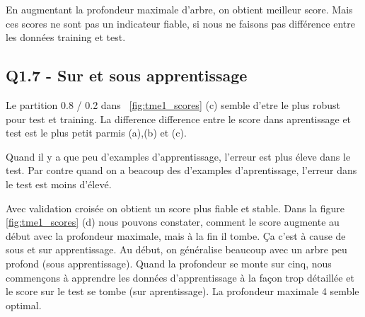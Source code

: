 \documentclass[a4paper,12pt]{article}
\begin{document}
En augmentant la profondeur maximale d'arbre, on obtient meilleur score.
Mais ces scores ne sont pas un indicateur fiable, si nous ne faisons pas différence entre les données training et test.

\subsection{Q1.7 -  Sur et sous apprentissage }

Le partition 0.8 / 0.2 dans ~\autoref{fig:tme1_scores} (c) semble d'etre le plus robust pour test et training.
La difference difference entre le score dans aprentissage et test est le plus petit parmis (a),(b) et (c).

Quand il y a que peu d'examples d'apprentissage, l'erreur est plus éleve dans le test.
Par contre quand on a beacoup des d'examples d'aprentissage, l'erreur dans le test est moins d'élevé.

Avec validation croisée on obtient un score plus fiable et stable.
Dans la figure \autoref{fig:tme1_scores} (d) nous pouvons constater, comment le score augmente au début avec la profondeur maximale, mais à la fin il tombe.
Ça c'est à cause de sous et sur apprentissage.
Au début, on généralise beaucoup avec un arbre peu profond (sous apprentissage).
Quand la profondeur se monte sur cinq,
nous commençons à apprendre les données d'apprentissage à la façon trop détaillée et le score sur le test se tombe (sur aprentissage).
La profondeur maximale 4 semble optimal.
\end{document}
